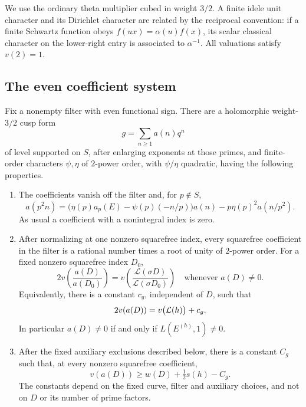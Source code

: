 We use the ordinary theta multiplier cubed in weight $3/2$. A finite
idele unit character and its Dirichlet character are related by the
reciprocal convention: if a finite Schwartz function obeys
$f(ux)=\alpha(u)f(x)$, its scalar classical character on the lower-right
entry is associated to $\alpha^{-1}$. All valuations satisfy $v(2)=1$.

\subsection{The even coefficient system}

\begin{proposition}
\label{prop:even-coefficients}\label{co:even}
Fix a nonempty filter with even functional sign.  There are a holomorphic
weight-$3/2$ cusp form
\[
                         g=\sum_{n\geq1}a(n)q^n
\]
of level supported on $S$, after enlarging exponents at those primes,
and finite-order characters $\psi,\eta$ of $2$-power order, with
$\psi/\eta$ quadratic, having the following properties.
\begin{enumerate}[label=\textup{(\roman*)}]
\item The coefficients vanish off the filter and, for $p\notin S$,
\begin{equation}
 a(p^2n)=\bigl(\eta(p)a_p(E)-\psi(p)(-n/p)\bigr)a(n)
                   -p\eta(p)^2a(n/p^2).
\label{cs:hecke-recurrence}
\end{equation}
As usual a coefficient with a nonintegral index is zero.
\item After normalizing at one nonzero squarefree index, every squarefree
coefficient in the filter is a rational number times a root of unity of
$2$-power order.  For a fixed nonzero squarefree index $D_0$,
\begin{equation}
 2v\left(\frac{a(D)}{a(D_0)}\right)
 =v\left(\frac{\mathcal L(\sigma D)}{\mathcal L(\sigma D_0)}\right)
 \quad\text{whenever }a(D)\ne0.
\label{cs:even-ratio}
\end{equation}
Equivalently, there is a constant $c_g$, independent of $D$, such that
\begin{equation}
       2v(a(D))=v\bigl({\cal L}(h)\bigr)+c_g.
\label{cs:even-value}
\end{equation}
In particular $a(D)\ne0$ if and only if $L(E^{(h)},1)\ne0$.
\item After the fixed auxiliary exclusions described below, there is a
constant $C_g$ such that, at every nonzero squarefree coefficient,
\begin{equation}
           v(a(D))\geq w(D)+\tfrac12s(h)-C_g.
\label{cs:even-lower-bound}
\end{equation}
The constants depend on the fixed curve, filter and auxiliary choices,
and not on $D$ or its number of prime factors.
\end{enumerate}
\end{proposition}


